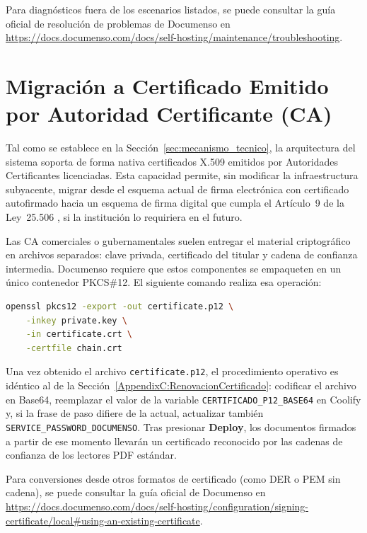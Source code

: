 Para diagnósticos fuera de los escenarios listados, se puede consultar la guía oficial de resolución de problemas de Documenso en \url{https://docs.documenso.com/docs/self-hosting/maintenance/troubleshooting}.


\section{Migración a Certificado Emitido por Autoridad Certificante (CA)}
\label{AppendixC:MigracionCA}

Tal como se establece en la Sección~\ref{sec:mecanismo_tecnico}, la arquitectura del sistema soporta de forma nativa certificados X.509 emitidos por Autoridades Certificantes licenciadas. Esta capacidad permite, sin modificar la infraestructura subyacente, migrar desde el esquema actual de firma electrónica con certificado autofirmado hacia un esquema de firma digital que cumpla el Artículo~9 de la Ley~25.506 \cite{ley25506}, si la institución lo requiriera en el futuro.

Las CA comerciales o gubernamentales suelen entregar el material criptográfico en archivos separados: clave privada, certificado del titular y cadena de confianza intermedia. Documenso requiere que estos componentes se empaqueten en un único contenedor PKCS\#12. El siguiente comando realiza esa operación:

\begin{lstlisting}[language=bash, caption={Empaquetado de certificado emitido por CA en formato PKCS\#12}, label={lst:apC_pkcs12_ca}]
openssl pkcs12 -export -out certificate.p12 \
    -inkey private.key \
    -in certificate.crt \
    -certfile chain.crt
\end{lstlisting}

Una vez obtenido el archivo \texttt{certificate.p12}, el procedimiento operativo es idéntico al de la Sección~\ref{AppendixC:RenovacionCertificado}: codificar el archivo en Base64, reemplazar el valor de la variable \texttt{CERTIFICADO\_\allowbreak P12\_\allowbreak BASE64} en Coolify y, si la frase de paso difiere de la actual, actualizar también \texttt{SERVICE\_\allowbreak PASSWORD\_\allowbreak DOCUMENSO}. Tras presionar \textbf{Deploy}, los documentos firmados a partir de ese momento llevarán un certificado reconocido por las cadenas de confianza de los lectores PDF estándar.

Para conversiones desde otros formatos de certificado (como DER o PEM sin cadena), se puede consultar la guía oficial de Documenso en \url{https://docs.documenso.com/docs/self-hosting/configuration/signing-certificate/local#using-an-existing-certificate}.
